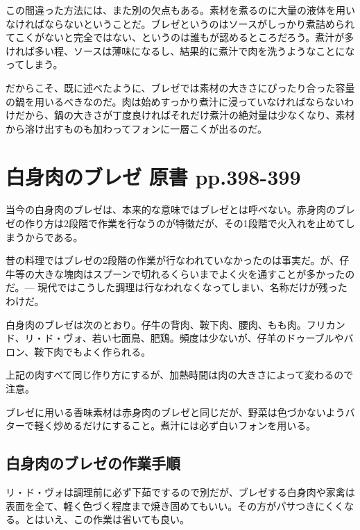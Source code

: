 この間違った方法には、また別の欠点もある。素材を煮るのに大量の液体を用いなければならないということだ。ブレゼというのはソースがしっかり煮詰められてこくがないと完全ではない、というのは誰もが認めるところだろう。煮汁が多ければ多い程、ソースは薄味になるし、結果的に煮汁で肉を洗うようなことになってしまう。

だからこそ、既に述べたように、ブレゼでは素材の大きさにぴったり合った容量の鍋を用いるべきなのだ。肉は始めすっかり煮汁に浸っていなければならないわけだから、鍋の大きさが丁度良ければそれだけ煮汁の絶対量は少なくなり、素材から溶け出すものも加わってフォンに一層こくが出るのだ。

\hypertarget{ux767dux8eabux8089ux306eux30d6ux30ecux30bc-ux539fux66f8-pp.398-399}{%
\section{白身肉のブレゼ 原書
pp.398-399}\label{ux767dux8eabux8089ux306eux30d6ux30ecux30bc-ux539fux66f8-pp.398-399}}

当今の白身肉のブレゼは、本来的な意味ではブレゼとは呼べない。赤身肉のブレゼの作り方は2段階で作業を行なうのが特徴だが、その1段階で火入れを止めてしまうからである。

昔の料理ではブレゼの2段階の作業が行なわれていなかったのは事実だ。が、仔牛等の大きな塊肉はスプーンで切れるくらいまでよく火を通すことが多かったのだ。---
現代ではこうした調理は行なわれなくなってしまい、名称だけが残ったわけだ。

白身肉のブレゼは次のとおり。仔牛の背肉、鞍下肉、腰肉、もも肉。フリカンド、リ・ド・ヴォ、若い七面鳥、肥鶏。頻度は少ないが、仔羊のドゥーブルやバロン、鞍下肉でもよく作られる。

上記の肉すべて同じ作り方にするが、加熱時間は肉の大きさによって変わるので注意。

ブレゼに用いる香味素材は赤身肉のブレゼと同じだが、野菜は色づかないようバターで軽く炒めるだけにすること。煮汁には必ず白いフォンを用いる。

\hypertarget{ux767dux8eabux8089ux306eux30d6ux30ecux30bcux306eux4f5cux696dux624bux9806}{%
\subsection{白身肉のブレゼの作業手順}\label{ux767dux8eabux8089ux306eux30d6ux30ecux30bcux306eux4f5cux696dux624bux9806}}

リ・ド・ヴォは調理前に必ず下茹でするので別だが、ブレゼする白身肉や家禽は表面を全て、軽く色づく程度まで焼き固めてもいい。その方がパサつきにくくなる。とはいえ、この作業は省いても良い。

